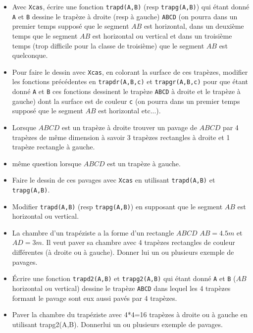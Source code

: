 \documentclass[a4paper,11pt]{book}
\begin{document}
\begin{itemize}
\item Avec {\tt Xcas}, \'ecrire une fonction {\tt trapd(A,B)} (resp 
{\tt trapg(A,B)}) qui  \'etant 
donn\'e {\tt A} et {\tt B} dessine le trap\`eze  \`a droite (resp \`a gauche)
{\tt ABCD} (on pourra dans un premier temps suppos\'e que le segment $AB$ est
horizontal, dans un deuxi\`eme temps que le segment $AB$ est
horizontal ou vertical et dans un troisi\`eme temps (trop difficile pour la 
classe de troisi\`eme) que le segment $AB$ est quelconque.\\ 
\item Pour faire le dessin avec {\tt Xcas}, en colorant la surface de ces 
trap\`ezes, modifier les fonctions pr\'ec\'edentes en {\tt trapdr(A,B,c)} et
{\tt trapgr(A,B,c)} pour que  \'etant donn\'e {\tt A} et {\tt B} ces fonctions
dessinent le trap\`eze {\tt ABCD} \`a droite et le trap\`eze \`a gauche) dont 
la surface est de couleur {\tt c} (on pourra dans un 
premier temps suppos\'e que le segment $AB$ est horizontal etc...).\\ 
\item Lorsque $ABCD$ est un trap\`eze \`a droite trouver un pavage de 
$ABCD$ par 4 trap\`ezes de m\^eme dimension \`a savoir 3 trap\`ezes rectangles 
\`a droite et 1 trap\`eze rectangle \`a gauche.
\item m\^eme question lorsque $ABCD$ est un trap\`eze \`a gauche.
\item Faire le dessin de ces pavages avec {\tt Xcas} en utilisant 
{\tt trapd(A,B)} et {\tt trapg(A,B)}.
\item Modifier  {\tt trapd(A,B)} (resp {\tt trapg(A,B)}) en supposant que le 
segment $AB$ est horizontal ou vertical.\\
\item La chambre d'un trap\'eziste a la forme d'un rectangle $ABCD$ $AB=4.5m$ 
et $AD=3m$. Il veut paver sa chambre avec 4 trap\`ezes rectangles de couleur 
diff\'erentes (\`a droite ou \`a gauche). Donner lui un ou plusieurs exemple de
pavages. 
\item \'Ecrire une fonction {\tt trapd2(A,B)} et {\tt trapg2(A,B)} qui  \'etant 
donn\'e {\tt A} et {\tt B} ($AB$  horizontal ou vertical) dessine le trap\`eze 
{\tt ABCD} dans lequel les 4 trap\`ezes formant le pavage sont eux aussi 
pav\'es par 4 trap\`ezes.
\item Paver la chambre du trap\'eziste avec 4*4=16 trap\`ezes \`a droite ou \`a
gauche en utilisant trapg2(A,B). Donnerlui un ou plusieurs exemple de pavages. 
\end{itemize}
\end{document}
